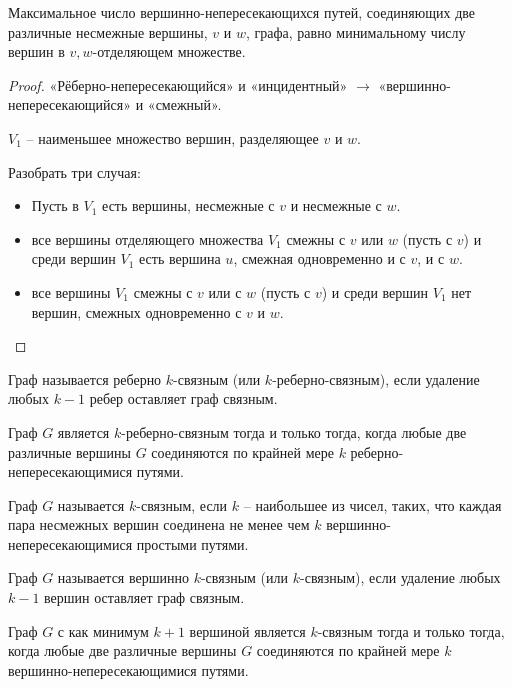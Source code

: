 	\begin{Thm}
		Максимальное число вершинно-непересекающихся путей, соединяющих две различные несмежные вершины, $v$ и $w$, графа, равно минимальному числу вершин в $v,w$-отделяющем множестве.
	\end{Thm}

	\begin{proof}
		«Рёберно-непересекающийся» и «инцидентный» $\to$ «вершинно-непересекающийся» и «смежный».
		
		$V_1$ -- наименьшее множество вершин, разделяющее $v$ и $w$.

		Разобрать три случая:

		\begin{itemize}
			\item Пусть в $V_1$ есть вершины, несмежные с $v$ и несмежные с $w$.
			\item все вершины отделяющего множества $V_1$ смежны с $v$ или $w$ (пусть с $v$) и среди вершин $V_1$ есть вершина $u$, смежная одновременно и с $v$, и с $w$.
			\item все вершины $V_1$ смежны с $v$ или с $w$ (пусть с $v$) и среди вершин $V_1$ нет вершин, смежных одновременно с $v$ и $w$.
		\end{itemize}
	\end{proof}

	\begin{Def}
		Граф называется реберно $k$-связным (или $k$-реберно-связным), если удаление любых $k-1$ ребер оставляет граф связным.
	\end{Def}

	\begin{Cons}
		Граф $G$ является $k$-реберно-связным тогда и только тогда, когда любые две различные вершины $G$ соединяются по крайней мере $k$ реберно-непересекающимися путями.
	\end{Cons}

	\begin{Def}
		Граф $G$ называется $k$-связным, если $k$ -- наибольшее из чисел, таких, что каждая пара несмежных вершин соединена не менее чем $k$ вершинно-непересекающимися простыми путями.
	\end{Def}

	\begin{Def}[Альтернативное]
		Граф $G$ называется вершинно $k$-связным (или $k$-связным), если удаление любых $k-1$ вершин оставляет граф связным.
	\end{Def}

	\begin{Cons}
		Граф $G$ с как минимум $k+1$ вершиной является $k$-связным тогда и только тогда, когда любые две различные вершины $G$ соединяются по крайней мере $k$ вершинно-непересекающимися путями.
	\end{Cons}

